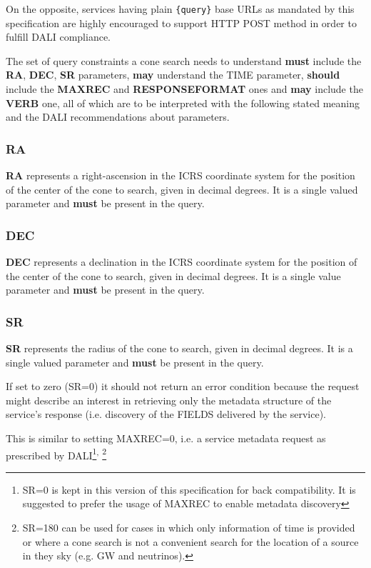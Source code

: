 \documentclass[11pt,a4paper]{ivoa}
\begin{document}
On the opposite, services having plain \texttt{\{query\}} base URLs as
mandated by this specification are highly encouraged to support HTTP
POST method in order to fulfill DALI compliance.

The set of query constraints a cone search needs to understand
\textbf{must} include the \textbf{RA}, \textbf{DEC}, \textbf{SR}
parameters, \textbf{may} understand the TIME parameter,
\textbf{should} include the \textbf{MAXREC} and \textbf{RESPONSEFORMAT}
ones and \textbf{may} include the \textbf{VERB} one, all of which are to
be interpreted with the following stated meaning and the DALI
recommendations about parameters.

\subsubsection{RA} \textbf{RA} represents a right-ascension in the ICRS
coordinate system for the position of the center of the cone to search,
given in decimal degrees. It is a single valued parameter and
\textbf{must} be present in the query.

\subsubsection{DEC} \textbf{DEC} represents a declination in the ICRS
coordinate system for the position of the center of the cone to search,
given in decimal degrees. It is a single value parameter and
\textbf{must} be present in the query.

\subsubsection{SR} \textbf{SR} represents the radius of the cone to
search, given in decimal degrees. It is a single valued parameter and
\textbf{must} be present in the query. 

If set to zero (SR=0) it should
not return an error condition because the request might describe an 
interest in retrieving only the metadata structure of the service's 
response (i.e. discovery of the FIELDS delivered by the service).

This is similar to setting MAXREC=0, i.e. a service metadata
request as prescribed by DALI\footnote{SR=0 is kept in this version of
this specification for back compatibility. It is suggested to prefer the
usage of MAXREC to enable metadata discovery}\textsuperscript{,
}\footnote{SR=180 can be used for cases in which only information of
time is provided or where a cone search is not a convenient search for
the location of a source in they sky (e.g. GW and neutrinos).}
\end{document}
